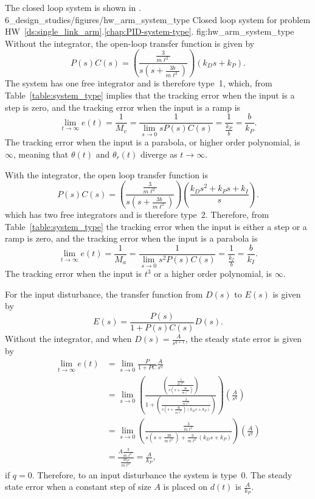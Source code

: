 The closed loop system is shown in .
	{6_design_studies/figures/hw_arm_system_type}
	{Closed loop system for problem HW~\ref{ds:single_link_arm}.\ref{chap:PID-system-type}.}
	{fig:hw_arm_system_type}
Without the integrator, the open-loop transfer function is given by
\[
P(s)C(s) = \left(\frac{\frac{3}{m\ell^2}}{s(s+\frac{3b}{m\ell^2})}\right)\left(k_D s + k_P\right).
\]
The system has one free integrator and is therefore type~1, which, from Table~\ref{table:system_type} implies that the tracking error when the input is a step is zero, and the tracking error when the input is a ramp is
\[
\lim_{t\to\infty}e(t) = \frac{1}{M_v} = \frac{1}{\lim_{s\to 0} sP(s)C(s)} = \frac{1}{\frac{k_P}{b}} = \frac{b}{k_P}.
\]
The tracking error when the input is a parabola, or higher order polynomial, is $\infty$, meaning that $\theta(t)$ and $\theta_r(t)$ diverge as $t\to\infty$.

With the integrator, the open loop transfer function is
\[
P(s)C(s) = \left(\frac{\frac{3}{m\ell^2}}{s(s+\frac{3b}{m\ell^2})}\right)\left(\frac{k_D s^2 + k_Ps + k_I}{s}\right).
\]
which has two free integrators and is therefore type~2. Therefore, from Table~\ref{table:system_type} the tracking error when the input is either a step or a ramp is zero, and the tracking error when the input is a parabola is
\[
\lim_{t\to\infty}e(t) = \frac{1}{M_a} = \frac{1}{\lim_{s\to 0} s^2P(s)C(s)} = \frac{1}{\frac{k_I}{b}} = \frac{b}{k_I}.
\]
The tracking error when the input is $t^3$ or a higher order polynomial, is $\infty$.

For the input disturbance, the transfer function from $D(s)$ to $E(s)$ is given by
\[
E(s) = \frac{P(s)}{1+P(s)C(s)}D(s).
\]
Without the integrator, and when $D(s)= \frac{A}{s^{q+1}}$, the steady state error is given by
\begin{align*}
\lim_{t\to\infty} e(t) &= \lim_{s\to 0} \frac{P}{1+PC}\frac{A}{s^q} \\
&= \lim_{s\to 0} \left(\frac{\left(\frac{\frac{3}{m\ell^2}}{s(s+\frac{3b}{m\ell^2})}\right)}{1+\left(\frac{\frac{3}{m\ell^2}}{s(s+\frac{3b}{m\ell^2})(k_Ds+k_P)}\right)}\right)\left(\frac{A}{s^q}\right) \\
&= \lim_{s\to 0} \left(\frac{\frac{3}{m\ell^2}}{s(s+\frac{3b}{m\ell^2})+\frac{3}{m\ell^2}(k_Ds+k_P)}\right)\left(\frac{A}{s^q}\right) \\
&= \frac{A\frac{3}{m\ell^2}}{\frac{3k_P}{m\ell^2}}
= \frac{A}{k_P},
\end{align*}
if $q=0$.  Therefore, to an input disturbance the system is type~0.  The steady state error when a constant step of size $A$ is placed on $d(t)$ is $\frac{A}{k_P}$.  

